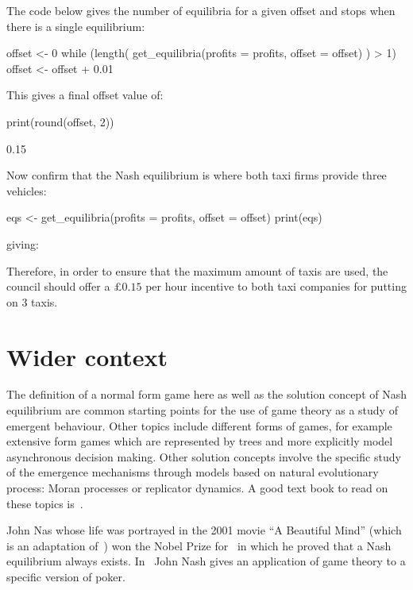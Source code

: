 The code below gives the number of equilibria for a given offset and stops when
there is a single equilibrium:

\begin{Rin}
offset <- 0
while (length(
  get_equilibria(profits = profits, offset = offset)
  ) > 1){
  offset <- offset + 0.01
}
\end{Rin}

This gives a final offset value of:

\begin{Rin}
print(round(offset, 2))
\end{Rin}

\begin{Rout}
[1] 0.15
\end{Rout}

Now confirm that the Nash equilibrium is where both taxi firms provide
three vehicles:

\begin{Rin}
eqs <- get_equilibria(profits = profits, offset = offset)
print(eqs)
\end{Rin}

giving:


Therefore, in order to ensure that the maximum amount of taxis are used, the
council should offer a \(\pounds 0.15\) per hour incentive to both taxi
companies for putting on 3 taxis.

\section{Wider context}\label{sec:game_theory_wider_context}

The definition of a normal form game here as well as the solution concept of
Nash equilibrium are common starting points for the use of game theory as a
study of emergent behaviour. Other topics include different forms of games, for
example extensive form games which are represented
by trees and more explicitly model asynchronous decision making. Other solution
concepts involve the specific study of the emergence mechanisms through models
based on natural evolutionary process: Moran processes or
replicator dynamics. A good text book to read on
these topics is~\cite{maschler2013game}.

John Nas whose life was portrayed in the 2001 movie ``A
Beautiful Mind'' (which is an adaptation of~\cite{nasar2011beautiful}) won the
Nobel Prize for~\cite{nash1950equilibrium} in which he proved that a Nash
equilibrium always exists. In~\cite{nash1951non} John Nash gives an
application of game theory to a specific version of poker.

